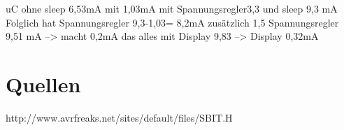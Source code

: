 \documentclass[journal, a4paper]{IEEEtran}
\begin{document}
uC ohne sleep 6,53mA mit 1,03mA
mit Spannungsregler3,3 und sleep 9,3 mA
Folglich hat Spannungsregler 9,3-1,03= 8,2mA
zusätzlich 1,5 Spannungsregler 9,51 mA --> macht 0,2mA
das alles mit Display 9,83 --> Display 0,32mA

\section{Quellen}
http://www.avrfreaks.net/sites/default/files/SBIT.H
\end{document}
